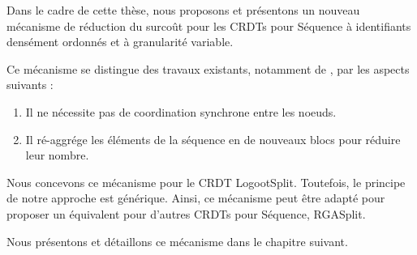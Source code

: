 Dans le cadre de cette thèse, nous proposons et présentons un nouveau mécanisme de réduction du surcoût pour les \acp{CRDT} pour Séquence à identifiants densément ordonnés et à granularité variable.

Ce mécanisme se distingue des travaux existants, notamment de \cite{letia:hal-01248270,zawirski:hal-01248197}, par les aspects suivants :
\begin{enumerate}
    \item Il ne nécessite pas de coordination synchrone entre les noeuds.
    \item Il ré-aggrége les éléments de la séquence en de nouveaux blocs pour réduire leur nombre.
\end{enumerate}

Nous concevons ce mécanisme pour le \ac{CRDT} LogootSplit.
Toutefois, le principe de notre approche est générique.
Ainsi, ce mécanisme peut être adapté pour proposer un équivalent pour d'autres \acp{CRDT} pour Séquence, \eg RGASplit.

Nous présentons et détaillons ce mécanisme dans le chapitre suivant.
